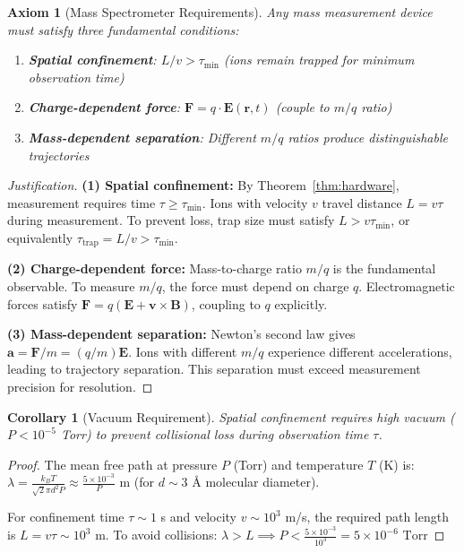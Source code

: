 \documentclass[twocolumn,10pt]{article}
\newtheorem{corollary}[theorem]{Corollary}
\newtheorem{axiom}{Axiom}
\begin{document}
\begin{axiom}[Mass Spectrometer Requirements]
\label{axiom:ms}
Any mass measurement device must satisfy three fundamental conditions:
\begin{enumerate}
    \item \textbf{Spatial confinement}: $L/v > \tau_{\min}$ (ions remain trapped for minimum observation time)
    \item \textbf{Charge-dependent force}: $\mathbf{F} = q \cdot \mathbf{E}(\mathbf{r}, t)$ (couple to $m/q$ ratio)
    \item \textbf{Mass-dependent separation}: Different $m/q$ ratios produce distinguishable trajectories
\end{enumerate}
\end{axiom}

\begin{proof}[Justification]
\textbf{(1) Spatial confinement:} By Theorem~\ref{thm:hardware}, measurement requires time $\tau \geq \tau_{\min}$. Ions with velocity $v$ travel distance $L = v\tau$ during measurement. To prevent loss, trap size must satisfy $L > v\tau_{\min}$, or equivalently $\tau_{\mathrm{trap}} = L/v > \tau_{\min}$.

\textbf{(2) Charge-dependent force:} Mass-to-charge ratio $m/q$ is the fundamental observable. To measure $m/q$, the force must depend on charge $q$. Electromagnetic forces satisfy $\mathbf{F} = q(\mathbf{E} + \mathbf{v} \times \mathbf{B})$, coupling to $q$ explicitly.

\textbf{(3) Mass-dependent separation:} Newton's second law gives $\mathbf{a} = \mathbf{F}/m = (q/m)\mathbf{E}$. Ions with different $m/q$ experience different accelerations, leading to trajectory separation. This separation must exceed measurement precision for resolution.
\end{proof}

\begin{corollary}[Vacuum Requirement]
\label{cor:vacuum}
Spatial confinement requires high vacuum ($P < 10^{-5}$ Torr) to prevent collisional loss during observation time $\tau$.
\end{corollary}

\begin{proof}
The mean free path at pressure $P$ (Torr) and temperature $T$ (K) is:
$
\lambda = \frac{k_B T}{\sqrt{2}\pi d^2 P} \approx \frac{5 \times 10^{-3}}{P} \text{ m}
$
(for $d \sim 3$ Å molecular diameter).

For confinement time $\tau \sim 1$ s and velocity $v \sim 10^3$ m/s, the required path length is $L = v\tau \sim 10^3$ m. To avoid collisions:
$
\lambda > L \implies P < \frac{5 \times 10^{-3}}{10^3} = 5 \times 10^{-6} \text{ Torr}
$
\end{proof}
\end{document}
